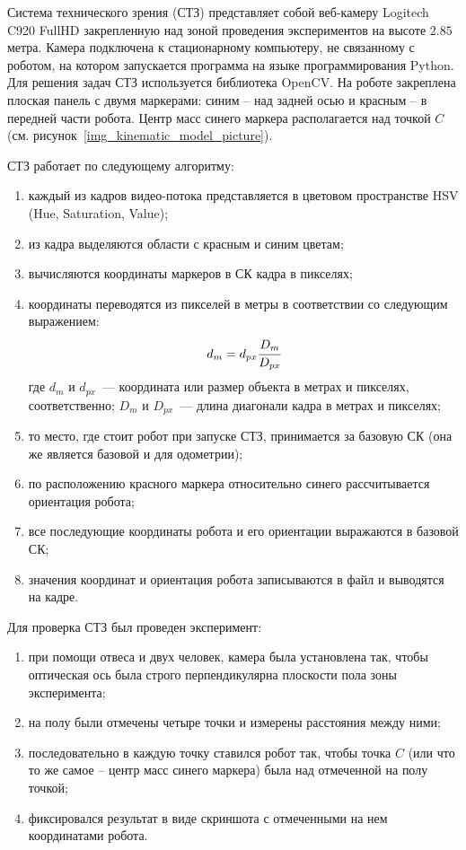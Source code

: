 \label{app_cv_system}

Система технического зрения (СТЗ) представляет собой веб-камеру Logitech C920 FullHD закрепленную над зоной проведения экспериментов на высоте $2.85$ метра. Камера подключена к стационарному компьютеру, не связанному с роботом, на котором запускается программа на языке программирования Python. Для решения задач СТЗ используется библиотека OpenCV. На роботе закреплена плоская панель с двумя маркерами: синим -- над задней осью и красным -- в передней части робота. Центр масс синего маркера располагается над точкой $C$ (см. рисунок~\ref{img_kinematic_model_picture}).

СТЗ работает по следующему алгоритму:
\begin{enumerate}
	\item каждый из кадров видео-потока представляется в цветовом пространстве HSV (Hue, Saturation, Value);
	\item из кадра выделяются области с красным и синим цветам;
	\item вычисляются координаты маркеров в СК кадра в пикселях;
	\item координаты переводятся из пикселей в метры в соответствии со следующим выражением:
	\begin{equation}
		d_{m} = d_{px} \cfrac{D_{m}}{D_{px}}
	\end{equation}
	где $d_{m}$ и $d_{px}$~--- координата или размер объекта в метрах и пикселях, соответственно; $D_{m}$ и $D_{px}$~--- длина диагонали кадра в метрах и пикселях;
	\item то место, где стоит робот при запуске СТЗ, принимается за базовую СК (она же является базовой и для одометрии);
	\item по расположению красного маркера относительно синего рассчитывается ориентация робота;
	\item все последующие координаты робота и его ориентации выражаются в базовой СК;
	\item значения координат и ориентация робота записываются в файл и выводятся на кадре.  
\end{enumerate}

Для проверка СТЗ был проведен эксперимент:
\begin{enumerate}
	\item при помощи отвеса и двух человек, камера была установлена так, чтобы оптическая ось была строго перпендикулярна плоскости пола зоны эксперимента;
	\item на полу были отмечены четыре точки и измерены расстояния между ними;
	\item последовательно в каждую точку ставился робот так, чтобы точка $C$ (или что то же самое -- центр масс синего маркера) была над отмеченной на полу точкой;
	\item фиксировался результат в виде скриншота с отмеченными на нем координатами робота. 
\end{enumerate}

